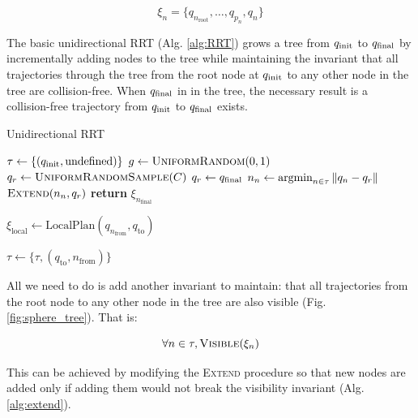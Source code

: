 \documentclass[conference]{IEEEtran}
\newcommand{\argmin}{\operatornamewithlimits{argmin}}
\begin{document}
\begin{equation}
\xi_n = \{q_{n_{\text{root}}}, \ldots, q_{p_n},  q_n\} 
\end{equation}

The basic unidirectional RRT (Alg. \ref{alg:RRT}) grows a tree from $q_{\text{init}}$ to
$q_{\text{final}}$ by incrementally adding nodes to the tree while maintaining the invariant that all
trajectories through the tree from the root node at $q_{\text{init}}$ to any other node
in the tree are collision-free. When $q_{\text{final}}$ in in the tree, the necessary result is a
collision-free trajectory from $q_{\text{init}}$ to $q_{\text{final}}$ exists.

\begin{algorithm}
\caption{Unidirectional RRT}\label{alg:RRT}
\begin{algorithmic}[1]
   \State$\tau \gets \{(q_{\text{init}}, \text{undefined})\}$
       \State $g \gets \textsc{UniformRandom}(0, 1)$  
       		\State $q_r \gets \textsc{UniformRandomSample}(C)$
       \Else
       		 \State $q_r \gets q_{\text{final}}$
       \EndIf
       \State $n_n \gets \argmin_{n \in \tau} \|q_n - q_r\|$
       \State $\textsc{Extend}(n_n, q_r)$ 
   \EndWhile
   \State \textbf{return} $\xi_{n_{\text{final}}}$
\EndProcedure

    \State $\xi_{\text{local}}  \gets \text{LocalPlan}(q_{n_{\text{from}}},
    q_{\text{to}})$
    
         \State $\tau \gets \{\tau, (q_{\text{to}}, n_{\text{from}})\}$
    \EndIf    
\EndProcedure

\end{algorithmic}
\end{algorithm}

All we need to do is add another invariant to maintain: that all
trajectories from the root node to any other node in the tree are also
visible (Fig. \ref{fig:sphere_tree}). That is:

\begin{equation}
    \forall n \in \tau, \textsc{Visible}(\xi_n)
\end{equation} 

This can be achieved by modifying the \textsc{Extend} procedure so that new
nodes are added only if adding them would not break the visibility invariant
(Alg. \ref{alg:extend}).
\end{document}
